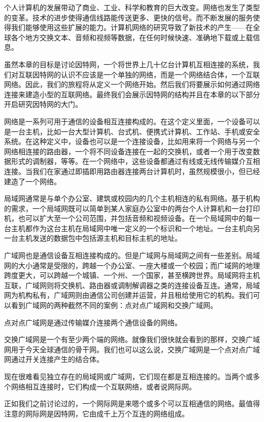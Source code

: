 个人计算机的发展带动了商业、工业、科学和教育的巨大改变。网络也发生了类型的变革。技术的进步使得通信线路能传送更多、更快的信号。而不断发展的服务使得我们能够使用这些扩展的能力。计算机网络的研究导致了新技术的产生——在全球各个地方交换文本、音频和视频等数据，在任何时候快速、准确地下载或上载信息。

虽然本章的目标是讨论因特网，一个将世界上几十亿台计算机互相连接的系统，我们对互联因特网的认识不应该是一个单独的网络，而是一个网络结合体，一个互联网络。因此，我们的旅程将从定义一个网络开始。然后我们将要展示如何通过网络连接来建造小型的互联网络。最终我们会展示因特网的结构并且在本章的以下部分开启研究因特网的大门。

网络是一系列可用于通信的设备相互连接构成的。在这个定义里面，一个设备可以是一台主机，比如一台大型计算机、台式机、便携式计算机、工作站、手机或安全系统。在这种定义中，设备也可以是一个连接设备，比如用来将一个网络与另一个网络相连接的路由器，一个将不同设备连接在一起的交换机，或者一个用于改变数据形式的调制器，等等。在一个网络中，这些设备都通过有线或无线传输媒介互相连接。当我们在家通过即插即用路由器连接两台计算机时，虽然规模很小，但已经建造了一个网络。

局域网通常是与单个办公室、建筑或校园内的几个主机相连的私有网络。基于机构的需求，一个局域网既可以简单到某人家庭办公室中的两台个人计算机和一台打印机，也可以扩大至一个公司范围，并包括音频和视频设备。在一个局域网中的每一台主机都作为这台主机在局域网中唯一定义的一个标识和一个地址。一台主机向另一台主机发送的数据包中包括源主机和目标主机的地址。

广域网也是通信设备互相连接构成的。但是广域网与局域网之间有一些差别。局域网的大小通常是受限的，跨越一个办公室、一座大楼或一个校园；而广域网的地理跨度更大，可以跨越一个城镇、一个州、一个国家，甚至横跨世界。局域网将主机互联，广域网则将交换机、路由器或调制解调器之类的连接设备互连。通常，局域网为机构私有，广域网则由通信公司创建并运营，并且租给使用它的机构。我们可以看到广域网的两种截然不同的案例：点对点广域网和交换广域网。

点对点广域网是通过传输媒介连接两个通信设备的网络。

交换广域网是一个有至少两个端的网络。就像我们很快就会看到的那样，交换广域网用于今天全球通信的骨干网。我们也可以这么说，交换广域网是一个点对点广域网通过开关连接产生的结合体。

现在很难看见独立存在的局域网或广域网，它们现在都是互相连接的。当两个或多个网络相互连接时，它们构成一个互联网络，或者说网际网。

正如我们之前讨论过的，一个网际网是来嗯个或多个可以互相通信的网络。最值得注意的网际网是因特网，它由成千上万个互连的网络组成。

